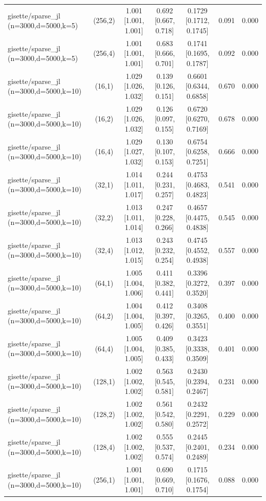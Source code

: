 \begin{tabular}{lcccccc}
gisette/sparse\_jl (n=3000,d=5000,k=5) & (256,2) & 1.001 [1.001, 1.001] & 0.692 [0.667, 0.718] & 0.1729 [0.1712, 0.1745] & 0.091 & 0.000 \\
gisette/sparse\_jl (n=3000,d=5000,k=5) & (256,4) & 1.001 [1.001, 1.001] & 0.683 [0.666, 0.701] & 0.1741 [0.1695, 0.1787] & 0.092 & 0.000 \\
gisette/sparse\_jl (n=3000,d=5000,k=10) & (16,1) & 1.029 [1.026, 1.032] & 0.139 [0.126, 0.151] & 0.6601 [0.6344, 0.6858] & 0.670 & 0.000 \\
gisette/sparse\_jl (n=3000,d=5000,k=10) & (16,2) & 1.029 [1.026, 1.032] & 0.126 [0.097, 0.155] & 0.6720 [0.6270, 0.7169] & 0.678 & 0.000 \\
gisette/sparse\_jl (n=3000,d=5000,k=10) & (16,4) & 1.029 [1.027, 1.032] & 0.130 [0.107, 0.153] & 0.6754 [0.6258, 0.7251] & 0.666 & 0.000 \\
gisette/sparse\_jl (n=3000,d=5000,k=10) & (32,1) & 1.014 [1.011, 1.017] & 0.244 [0.231, 0.257] & 0.4753 [0.4683, 0.4823] & 0.541 & 0.000 \\
gisette/sparse\_jl (n=3000,d=5000,k=10) & (32,2) & 1.013 [1.011, 1.014] & 0.247 [0.228, 0.266] & 0.4657 [0.4475, 0.4838] & 0.545 & 0.000 \\
gisette/sparse\_jl (n=3000,d=5000,k=10) & (32,4) & 1.013 [1.012, 1.015] & 0.243 [0.232, 0.254] & 0.4745 [0.4552, 0.4938] & 0.557 & 0.000 \\
gisette/sparse\_jl (n=3000,d=5000,k=10) & (64,1) & 1.005 [1.004, 1.006] & 0.411 [0.382, 0.441] & 0.3396 [0.3272, 0.3520] & 0.397 & 0.000 \\
gisette/sparse\_jl (n=3000,d=5000,k=10) & (64,2) & 1.004 [1.004, 1.005] & 0.412 [0.397, 0.426] & 0.3408 [0.3265, 0.3551] & 0.400 & 0.000 \\
gisette/sparse\_jl (n=3000,d=5000,k=10) & (64,4) & 1.005 [1.004, 1.005] & 0.409 [0.385, 0.433] & 0.3423 [0.3338, 0.3509] & 0.401 & 0.000 \\
gisette/sparse\_jl (n=3000,d=5000,k=10) & (128,1) & 1.002 [1.002, 1.002] & 0.563 [0.545, 0.581] & 0.2430 [0.2394, 0.2467] & 0.231 & 0.000 \\
gisette/sparse\_jl (n=3000,d=5000,k=10) & (128,2) & 1.002 [1.002, 1.002] & 0.561 [0.542, 0.580] & 0.2432 [0.2291, 0.2572] & 0.229 & 0.000 \\
gisette/sparse\_jl (n=3000,d=5000,k=10) & (128,4) & 1.002 [1.002, 1.002] & 0.555 [0.537, 0.574] & 0.2445 [0.2401, 0.2489] & 0.234 & 0.000 \\
gisette/sparse\_jl (n=3000,d=5000,k=10) & (256,1) & 1.001 [1.001, 1.001] & 0.690 [0.669, 0.710] & 0.1715 [0.1676, 0.1754] & 0.088 & 0.000 \\

\end{tabular}
